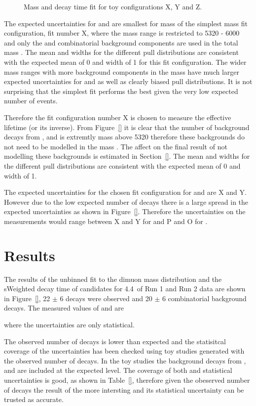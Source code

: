 {\begin{figure}[htbp]
    \caption{Mass and decay time \ml fit for toy configurations X, Y and Z.}
    \label{fig:toyegs}
\end{figure}


The expected uncertainties for \tmumu and \Gmumu are smallest for mass of the simplest mass fit configuration, fit number X, where the mass range is restricted to 5320 - 6000 \mevcc and only the \bsmumu and combinatorial background components are used in the total mass \pdf. The mean and widths for the different pull distributions are consistent with the expected mean of 0 and width of 1 for this fit configuration. The wider mass ranges with more background components in the mass \pdf have much larger expected uncertainties for \tmumu and \Gmumu as well as clearly biased pull distributions. It is not surprising that the simplest fit performs the best given the very low expected number of events. 

Therefore the fit configuration number X is chosen to measure the \bsmumu effective lifetime (or its inverse). From Figure~\ref{} it is clear that the number of background decays from \bdmumu, \bhh and \lambdab is extremtly mass above 5320 \mevcc therefore these backgrounds do not need to be modelled in the mass \pdf. The affect on the final result of not modelling these backgrounds is estimated in Section~\ref{}. The mean and widths for the different pull distributions are consistent with the expected mean of 0 and width of 1. 


The expected uncertainties for the chosen fit configuration for \tmumu and \Gmumu are X and Y. However due to the low expected number of decays there is a large spread in the expected uncertainties as shown in Figure~\ref{}. Therefore the uncertainties on the measurements would range between X and Y for \tmumu and P and O for \Gmumu.


\section{Results}
\label{sec:ELresults}

The results of the unbinned \ml fit to the dimuon mass distribution and the sWeighted decay time of \bsmumu candidates for 4.4~\fb of Run 1 and Run 2 data are shown in Figure~\ref{}, 22 $\pm$ 6 \bsmumu decays were observed and 20 $\pm$ 6 combinatorial background decays. The measured values of \tmumu and \Gmumu are


where the uncertainties are only statistical. 

The observed number of decays is lower than expected and the statisitcal coverage of the uncertainties has been checked using toy studies generated with the observed number of decays. In the toy studies the background decays from \bhh, \bdmumu and \lambdab are included at the expected level. The coverage of both \tmumu and \Gmumu statistical uncertainties is good, as shown in Table~\ref{}, therefore given the obeserved number of decays the result of the more intersting \tmumu and its statistical uncertainty can be trusted as accurate. %



}
